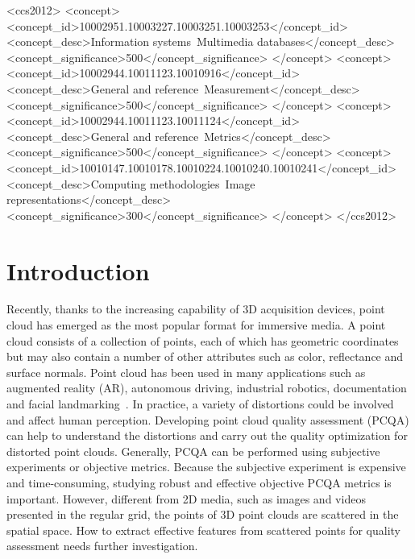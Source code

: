 \documentclass[acmsmall]{acmart}
\begin{document}
\begin{CCSXML}
<ccs2012>
<concept>
<concept_id>10002951.10003227.10003251.10003253</concept_id>
<concept_desc>Information systems~Multimedia databases</concept_desc>
<concept_significance>500</concept_significance>
</concept>
<concept>
<concept_id>10002944.10011123.10010916</concept_id>
<concept_desc>General and reference~Measurement</concept_desc>
<concept_significance>500</concept_significance>
</concept>
<concept>
<concept_id>10002944.10011123.10011124</concept_id>
<concept_desc>General and reference~Metrics</concept_desc>
<concept_significance>500</concept_significance>
</concept>
<concept>
<concept_id>10010147.10010178.10010224.10010240.10010241</concept_id>
<concept_desc>Computing methodologies~Image representations</concept_desc>
<concept_significance>300</concept_significance>
</concept>
</ccs2012>
\end{CCSXML}



\maketitle

\section{Introduction}
\par Recently, thanks to the increasing capability of 3D acquisition devices, point cloud has emerged as the most popular format for immersive media. A point cloud consists of a collection of points, each of which has geometric coordinates but may also contain a number of other attributes such as color, reflectance and surface normals. Point cloud has been used in many applications such as augmented reality (AR), autonomous driving, industrial robotics, documentation and facial landmarking~\cite{Demisse2018Facial,Sun2019Landmarking}. In practice, a variety of distortions could be involved and affect human perception. Developing point cloud quality assessment (PCQA) can help to understand the distortions and carry out the quality optimization for distorted point clouds. Generally, PCQA can be performed using subjective experiments or objective metrics. Because the subjective experiment is expensive and time-consuming, studying robust and effective objective PCQA metrics is important. However, different from 2D media, such as images and videos presented in the regular grid, the points of 3D point clouds are scattered in the spatial space. How to extract effective features from scattered points for quality assessment needs further investigation.
\end{document}
